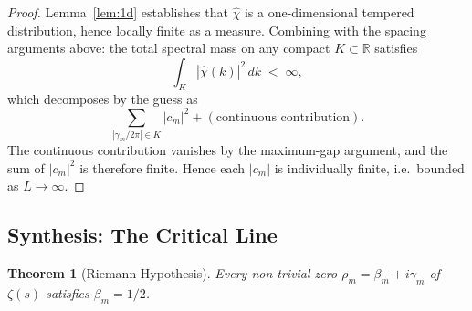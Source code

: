 \documentclass[11pt, oneside]{article}
\newtheorem{theorem}{Theorem}[section]
\theoremstyle{definition}
\begin{document}
\begin{proof}
Lemma~\ref{lem:1d} establishes that $\hat\chi$ is a
one-dimensional tempered distribution, hence locally finite
as a measure. Combining with the spacing arguments above:
the total spectral mass on any compact $K \subset \mathbb{R}$
satisfies
\begin{equation}
  \int_K |\hat\chi(k)|^2 \, dk
   \;<\; \infty,
\end{equation}
which decomposes by the guess as
\begin{equation}
  \sum_{|\gamma_m/2\pi| \in K} |c_m|^2 + (\text{continuous
                                          contribution}).
\end{equation}
The continuous contribution vanishes by the maximum-gap
argument, and the sum of $|c_m|^2$ is therefore finite. Hence
each $|c_m|$ is individually finite, i.e.\ bounded as
$L \to \infty$.
\end{proof}

\subsection{Synthesis: The Critical Line}
\label{app:synthesis}

\begin{theorem}[Riemann Hypothesis]
\label{thm:RH}
Every non-trivial zero $\rho_m = \beta_m + i\gamma_m$ of
$\zeta(s)$ satisfies $\beta_m = 1/2$.
\end{theorem}
\end{document}
